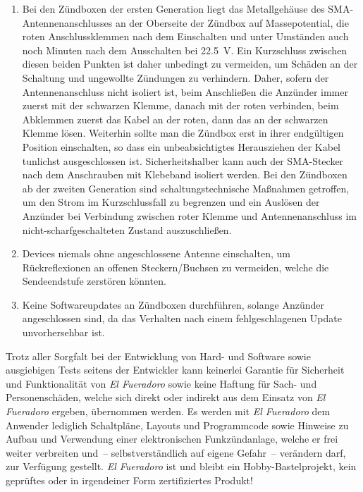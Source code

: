 \documentclass[paper=a4, parskip, numbers=noenddot, toc=listof, headsepline]{scrbook}
\newcommand{\anlage}{\emph{El Fueradoro}}
\begin{document}
	{\bfseries
	\begin{enumerate}
		\item
		      Bei den Zündboxen der ersten Generation liegt das Metallgehäuse des SMA-Antennen\-anschlusses an der Oberseite der Zündbox auf Massepotential, die roten Anschlussklemmen nach dem Einschalten und unter Umständen auch noch Minuten nach dem Ausschalten bei \SI{22,5}{\volt}. Ein Kurzschluss zwischen diesen beiden Punkten ist daher unbedingt zu vermeiden, um Schäden an der Schaltung und ungewollte Zündungen zu verhindern. Daher, sofern der Antennenanschluss nicht isoliert ist, beim Anschließen die Anzünder immer zuerst mit der schwarzen Klemme, danach mit der roten verbinden, beim Abklemmen zuerst das Kabel an der roten, dann das an der schwarzen Klemme lösen. Weiterhin sollte man die Zündbox erst in ihrer endgültigen Position einschalten, so dass ein unbeabsichtigtes Herausziehen der Kabel tunlichst ausgeschlossen ist. Sicherheitshalber kann auch der SMA-Stecker nach dem Anschrauben mit Klebeband isoliert werden. Bei den Zündboxen ab der zweiten Generation sind schaltungstechnische Maßnahmen getroffen, um den Strom im Kurzschlussfall zu begrenzen und ein Auslösen der Anzünder bei Verbindung zwischen roter Klemme und Antennenanschluss im nicht-scharfgeschalteten Zustand auszuschließen.
		\item
		      Devices niemals ohne angeschlossene Antenne einschalten, um Rückreflexionen an offenen Steckern/Buchsen zu vermeiden, welche die Sendeendstufe zerstören könnten.
		\item
		      Keine Softwareupdates an Zündboxen durchführen, solange Anzünder angeschlossen sind, da das Verhalten nach einem fehlgeschlagenen Update unvorhersehbar ist.
	\end{enumerate}
	}

	Trotz aller Sorgfalt bei der Entwicklung von Hard- und Software sowie ausgiebigen Tests seitens der Entwickler kann keinerlei Garantie für Sicherheit und Funktionalität von {\anlage} sowie keine Haftung für Sach- und Personenschäden, welche sich direkt oder indirekt aus dem Einsatz von {\anlage} ergeben, übernommen werden. Es werden mit {\anlage} dem Anwender lediglich Schaltpläne, Layouts und Programmcode sowie Hinweise zu Aufbau und Verwendung einer elektronischen Funkzündanlage, welche er frei weiter verbreiten und~-- selbstverständlich auf eigene Gefahr~-- verändern darf, zur Verfügung gestellt. {\anlage} ist und bleibt ein Hobby-Bastelprojekt, kein geprüftes oder in irgendeiner Form zertifiziertes Produkt!
\end{document}
